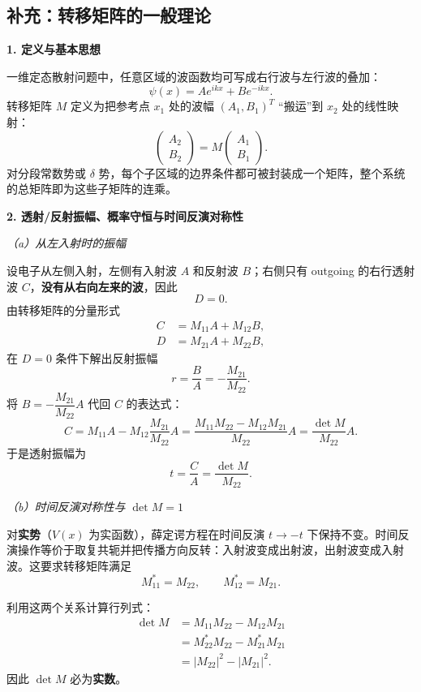 \subsection{补充：转移矩阵的一般理论}

\textbf{1. 定义与基本思想}

一维定态散射问题中，任意区域的波函数均可写成右行波与左行波的叠加：
\[
\psi(x) = A e^{ikx} + B e^{-ikx}.
\]
转移矩阵 $M$ 定义为把参考点 $x_1$ 处的波幅 $(A_1,B_1)^T$ ``搬运''到 $x_2$ 处的线性映射：
\[
\begin{pmatrix} A_2 \\ B_2 \end{pmatrix} = M \begin{pmatrix} A_1 \\ B_1 \end{pmatrix}.
\]
对分段常数势或 $\delta$ 势，每个子区域的边界条件都可被封装成一个矩阵，整个系统的总矩阵即为这些子矩阵的连乘。

\textbf{2. 透射/反射振幅、概率守恒与时间反演对称性}

\textit{（a）从左入射时的振幅}

设电子从左侧入射，左侧有入射波 $A$ 和反射波 $B$；右侧只有 outgoing 的右行透射波 $C$，\textbf{没有从右向左来的波}，因此
\[
\boxed{D = 0}.
\]
由转移矩阵的分量形式
\begin{align*}
C &= M_{11}A + M_{12}B, \\
D &= M_{21}A + M_{22}B,
\end{align*}
在 $D=0$ 条件下解出反射振幅
\[
\boxed{r = \frac{B}{A} = -\frac{M_{21}}{M_{22}}}.
\]
将 $B = -\dfrac{M_{21}}{M_{22}}A$ 代回 $C$ 的表达式：
\[
C = M_{11}A - M_{12}\frac{M_{21}}{M_{22}}A
= \frac{M_{11}M_{22} - M_{12}M_{21}}{M_{22}}A
= \frac{\det M}{M_{22}}A.
\]
于是透射振幅为
\[
\boxed{t = \frac{C}{A} = \frac{\det M}{M_{22}}}.
\]

\textit{（b）时间反演对称性与 $\det M = 1$}

对\textbf{实势}（$V(x)$ 为实函数），薛定谔方程在时间反演 $t\to -t$ 下保持不变。时间反演操作等价于取复共轭并把传播方向反转：入射波变成出射波，出射波变成入射波。这要求转移矩阵满足
\[
\boxed{M_{11}^* = M_{22}}, \qquad \boxed{M_{12}^* = M_{21}}.
\]

利用这两个关系计算行列式：
\begin{align*}
\det M &= M_{11}M_{22} - M_{12}M_{21} \\
&= M_{22}^*M_{22} - M_{21}^*M_{21} \\
&= |M_{22}|^2 - |M_{21}|^2.
\end{align*}
因此 $\det M$ 必为\textbf{实数}。

